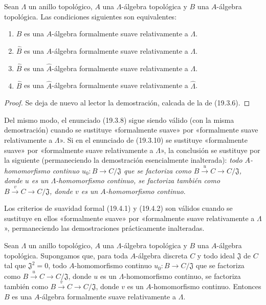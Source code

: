 \begin{proposition}[19.9.4]
\label{0.19.9.4-fr}
Sean $\Lambda$ un anillo topológico, $A$ una $\Lambda$-álgebra topológica y
$B$ una $A$-álgebra topológica. Las condiciones siguientes son equivalentes:
\begin{enumerate}
  \item[\textup{a)}] $B$ es una $A$-álgebra formalmente suave relativamente a $\Lambda$.
  \item[\textup{b)}] $\widehat B$ es una $A$-álgebra formalmente suave relativamente a
  $\Lambda$.
  \item[\textup{c)}] $\widehat B$ es una $\widehat A$-álgebra formalmente suave
  relativamente a $\Lambda$.
  \item[\textup{d)}] $\widehat B$ es una $\widehat A$-álgebra formalmente suave
  relativamente a $\widehat\Lambda$.
\end{enumerate}
\end{proposition}

\begin{proof}
Se deja de nuevo al lector la demostración, calcada de la de (19.3.6).
\end{proof}


\begin{env}[19.9.5]
\label{0.19.9.5-fr}
Del mismo modo, el enunciado (19.3.8) sigue siendo válido (con la misma
demostración) cuando se sustituye «formalmente suave» por «formalmente suave
relativamente a $\Lambda$». Si en el enunciado de (19.3.10) se sustituye
«formalmente suave» por «formalmente suave relativamente a $\Lambda$», la
conclusión se sustituye por la siguiente (permaneciendo la demostración
esencialmente inalterada): \emph{todo $A$-homomorfismo continuo
$u_0:B\to C/\mathfrak J$ que se factoriza como
$B\xrightarrow{u}C\to C/\mathfrak J$, donde $u$ es un $\Lambda$-homomorfismo
continuo, se factoriza también como $B\xrightarrow{v}C\to C/\mathfrak J$, donde
$v$ es un $A$-homomorfismo continuo}.
\end{env}

\begin{env}[19.9.6]
\label{0.19.9.6-fr}
Los criterios de suavidad formal (19.4.1) y (19.4.2) son válidos cuando se
sustituye en ellos «formalmente suave» por «formalmente suave relativamente a
$\Lambda$», permaneciendo las demostraciones prácticamente inalteradas.
\end{env}

\begin{proposition}[19.9.7]
\label{0.19.9.7-fr}
Sean $\Lambda$ un anillo topológico, $A$ una $\Lambda$-álgebra topológica y
$B$ una $A$-álgebra topológica. Supongamos que, para toda $A$-álgebra discreta
$C$ y todo ideal $\mathfrak J$ de $C$ tal que $\mathfrak J^2=0$, todo
$A$-homomorfismo continuo $u_0:B\to C/\mathfrak J$ que se factoriza como
$B\xrightarrow{u}C\to C/\mathfrak J$, donde $u$ es un $\Lambda$-homomorfismo
continuo, se factoriza también como $B\xrightarrow{v}C\to C/\mathfrak J$, donde
$v$ es un $A$-homomorfismo continuo. Entonces $B$ es una $A$-álgebra
formalmente suave relativamente a $\Lambda$.
\end{proposition}

